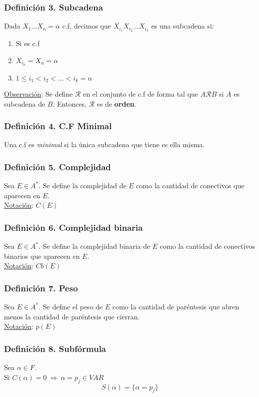 \documentclass{article}
\newcommand{\relates}{\mathcal{R}}                      %
\newcommand{\Rightarrows}{\: \Rightarrow \:}            %
\begin{document}
\subsubsection*{Definición 3. Subcadena}
Dada $X_1 ... X_n = \alpha$ c.f, decimos que $X_{i_1} X_{i_2} ...X_{i_k}$
es una subcadena si:
\begin{enumerate}
	\item Si es c.f
	\item $X_{i_k} = X_n = \alpha$
	\item $1 \leq i_1 < i_2 < ... < i_k = n$
\end{enumerate}
\underline{Observación}: Se define $\relates$ en el conjunto de c.f de forma tal que $A \relates B$ 
si $A$ es subcadena de $B$. Entonces, $\relates$ es de \textbf{orden}.

\subsubsection*{Definición 4. C.F Minimal}
Una c.f es \emph{minimal} si la única subcadena que tiene es ella misma.

\subsubsection*{Definición 5. Complejidad}
Sea $E \in A^*$. Se define la complejidad de $E$ como la cantidad de conectivos que aparecen en $E$.
\\\underline{Notación}: $C(E)$

\subsubsection*{Definición 6. Complejidad binaria}
Sea $E \in A^*$. Se define la complejidad binaria de $E$ como la cantidad de conectivos binarios 
que aparecen en $E$.
\\\underline{Notación}: $Cb(E)$

\subsubsection*{Definición 7. Peso}
Sea $E \in A^*$. Se define el peso de $E$ como la cantidad de paréntesis que abren menos la cantidad de paréntesis que cierran.
\\\underline{Notación}: $p(E)$


\subsubsection*{Definición 8. Subfórmula}
Sea $\alpha \in F$.
\\Si $C(\alpha) = 0 \Rightarrows \alpha = p_j \in VAR$
\begin{equation*}
	S(\alpha) = \{\alpha = p_j\}
\end{equation*}
\end{document}
